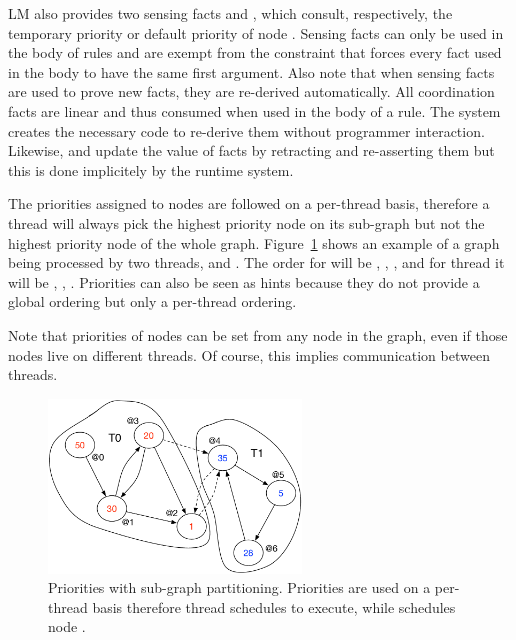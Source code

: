 LM also provides two sensing facts  and
, which consult, respectively, the
temporary priority or default priority  of node .  Sensing facts
can only be used in the body of rules and are exempt from the constraint that
forces every fact used in the body to have the same first argument. Also note
that when sensing facts are used to prove new facts, they are re-derived
automatically. All coordination facts are linear and thus consumed when used in
the body of a rule.  The system creates the necessary code to re-derive them
without programmer interaction. Likewise,  and
 update the value of  facts by
retracting and re-asserting them but this is done implicitely by the runtime
system.

The priorities assigned to nodes are followed on a per-thread basis, therefore a
thread will always pick the highest priority node on its sub-graph but not the
highest priority node of the whole graph.
Figure~\ref{fig:coordination:priorities} shows an example of a graph being
processed by two threads,  and . The order for  will
be , , ,  and for thread  it will
be , , . Priorities can also be seen as hints because
they do not provide a global ordering but only a per-thread ordering.

Note that priorities of nodes can be set from any node in the graph, even if those nodes
live on different threads. Of course, this implies communication between
threads.

\begin{figure}
\begin{center}
   \includegraphics[width=0.6\textwidth]{figures/coordination/priorities.pdf}
\end{center}
\caption{Priorities with sub-graph partitioning. Priorities are used on a
   per-thread basis therefore thread  schedules  to
   execute, while  schedules node .}
\label{fig:coordination:priorities}
\end{figure}
